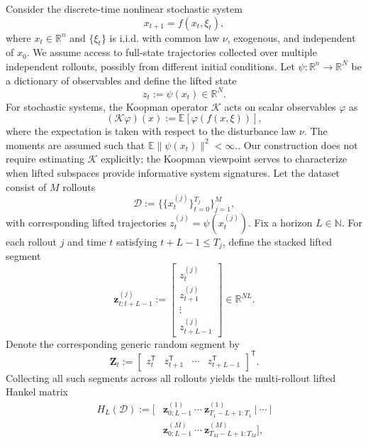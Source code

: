 \documentclass[letterpaper, 10 pt, conference]{ieeeconf}  %
\newcommand{\E}{\mathbb{E}}
\newcommand{\R}{\mathbb{R}}
\newcommand{\T}{^{\mathsf T}}
\begin{document}
Consider the discrete-time nonlinear stochastic system 
\begin{equation}
  x_{t+1}=f(x_t,\xi_t),
  \label{eq:nl_system_noise}
\end{equation}
where $x_t\in\R^n$ and $\{\xi_t\}$ is i.i.d. with common law $\nu$, exogenous, and independent of $x_0$. We assume access to full-state trajectories collected over multiple independent rollouts, possibly from different initial conditions. Let $\psi:\R^n\to\R^N$ be a dictionary of observables and define the lifted state
\begin{equation}
  z_t:=\psi(x_t)\in\R^N.
  \label{eq:lifted_state}
\end{equation}
For stochastic systems, the Koopman operator $\mathcal K$ acts on scalar observables $\varphi$ as \cite{Lasota}
\begin{equation}
  (\mathcal K\varphi)(x):=\E[\varphi(f(x,\xi))],
  \label{eq:stoch_koopman_def}
\end{equation}
where the expectation is taken with respect to {\color{black}the disturbance law $\nu$. The moments are assumed such that $\E\|\psi(x_t)\|^2<\infty$.}. Our construction does not require estimating $\mathcal K$ explicitly; the Koopman viewpoint serves to characterize when lifted subspaces provide informative system signatures. Let the dataset consist of $M$ rollouts
\[
  \mathcal D:=\Big\{\{x_t^{(j)}\}_{t=0}^{T_j}\Big\}_{j=1}^{M},
\]
with corresponding lifted trajectories $z_t^{(j)}=\psi(x_t^{(j)})$. Fix a horizon $L\in\mathbb N$. For each rollout $j$ and time $t$ satisfying $t+L-1\leq T_j$, define the stacked lifted segment
\begin{equation}
  \mathbf z_{t:t+L-1}^{(j)}:=
  \begin{bmatrix}
    z_t^{(j)}\\ z_{t+1}^{(j)}\\ \vdots\\ z_{t+L-1}^{(j)}
  \end{bmatrix}\in\R^{NL}.
  \label{eq:stacked_segment}
\end{equation}
Denote the corresponding generic random segment by
\[
  \mathbf Z_t:=
  \begin{bmatrix}z_t\T&z_{t+1}\T&\cdots&z_{t+L-1}\T\end{bmatrix}\T.
\]
Collecting all such segments across all rollouts yields the multi-rollout lifted Hankel matrix
\begin{equation}
\begin{split}
  H_L(\mathcal D):=\big[&\mathbf z_{0:L-1}^{(1)}\ \cdots\ \mathbf z_{T_1-L+1:T_1}^{(1)}\ \big|\ \cdots\ \big|\\
  &\mathbf z_{0:L-1}^{(M)}\ \cdots\ \mathbf z_{T_M-L+1:T_M}^{(M)}\big],
\end{split}
  \label{eq:multirollout_matrix}
\end{equation}
\end{document}
